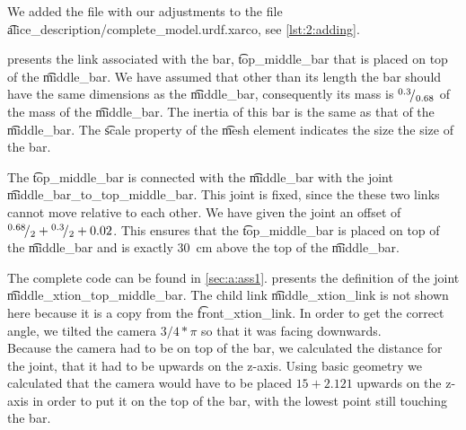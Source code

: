 We added the file with our adjustments to the file \t{alice_description/complete_model.urdf.xarco}, see \cref{lst:2:adding}.
%

%
 presents the link associated with the bar, \t{top_middle_bar} that is placed on top of the \t{middle_bar}. We have assumed that other than its length the bar should have the same dimensions as the \t{middle_bar}, consequently its mass is ${}^{0.3}\!/_{0.68}$ of the mass of the \t{middle_bar}. The inertia of this bar is the same as that of the \t{middle_bar}. The \t{scale} property of the \t{mesh} element indicates the size the size of the bar. 
%

%
The \t{top_middle_bar} is connected with the \t{middle_bar} with the joint \t{middle_bar_to_top_middle_bar}. This joint is fixed, since the these two links cannot move relative to each other. We have given the joint an offset of ${}^{0.68}\!/_{2} + {}^{0.3}\!/_{2} + 0.02$. This ensures that the \t{top_middle_bar} is placed on top of the \t{middle_bar} and is exactly \SI{30}{\centi\meter} above the top of the \t{middle_bar}.
%

%

%
The complete code can be found in \cref{sec:a:ass1}.  presents the definition of the joint \t{middle_xtion_top_middle_bar}. The child link \t{middle_xtion_link} is not shown here because it is a copy from the \t{front_xtion_link}. In order to get the correct angle, we tilted the camera $3/4 * \pi$ so that it was facing downwards.\\

Because the camera had to be on top of the bar, we calculated the distance for the joint, that it had to be upwards on the z-axis. Using basic geometry we calculated that the camera would have to be placed $15+2.121$ upwards on the z-axis in order to put it on the top of the bar, with the lowest point still touching the bar.